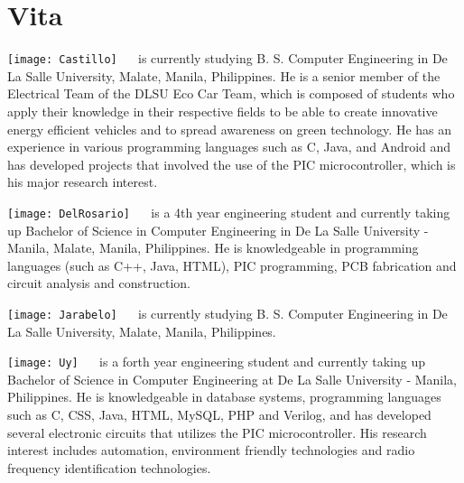 \chapter{Vita}



\texttt{[image: Castillo]}
 \  \ is currently studying B. S. Computer Engineering in De La Salle University, Malate, Manila, Philippines. He is a senior member of the Electrical Team of the DLSU Eco Car Team, which is composed of students who apply their knowledge in their respective fields to be able to create innovative energy efficient vehicles and to spread awareness on green technology. He has an experience in various programming languages such as C, Java, and Android and has developed projects that involved the use of the PIC microcontroller, which is his major research interest. 

\texttt{[image: DelRosario]}
 \  \ is a 4th year engineering student and currently taking up Bachelor of Science in Computer Engineering in De La Salle University - Manila, Malate, Manila, Philippines. He is knowledgeable in programming languages (such as C++, Java, HTML), PIC programming, PCB fabrication and circuit analysis and construction.

\texttt{[image: Jarabelo]}
 \  \ is currently studying B. S. Computer Engineering in De La Salle University, Malate, Manila, Philippines. 

\texttt{[image: Uy]}
 \  \ is a forth year engineering student and currently taking up Bachelor of Science in Computer Engineering at De La Salle University - Manila, Philippines. He is knowledgeable in database systems, programming languages such as C, CSS, Java, HTML, MySQL, PHP and Verilog, and has developed several electronic circuits that utilizes the PIC microcontroller. His research interest includes automation, environment friendly technologies and radio frequency identification technologies.


